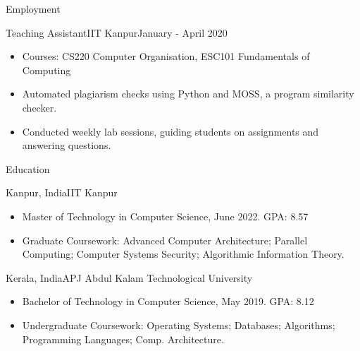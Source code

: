 \documentclass[]{mcdowellcv}
\begin{document}
\begin{cvsection}{Employment}
  		\begin{cvsubsection}{Teaching Assistant}{IIT Kanpur}{January - April 2020}		
			\begin{itemize}
   				\item Courses: CS220 Computer Organisation, ESC101 Fundamentals of Computing
				\item Automated plagiarism checks using Python and MOSS, a program similarity checker.
				\item Conducted weekly lab sessions, guiding students on assignments and answering questions.
			\end{itemize}
		\end{cvsubsection}

	\end{cvsection}
	
	\begin{cvsection}{Education}
		\begin{cvsubsection2}{Kanpur, India}{IIT Kanpur}{}
			\begin{itemize}
				\item Master of Technology in Computer Science, June 2022. GPA: 8.57
				\item Graduate Coursework: Advanced Computer Architecture; Parallel Computing; Computer Systems Security; Algorithmic Information Theory.

			\end{itemize}
		\end{cvsubsection2}

  		\begin{cvsubsection2}{Kerala, India}{APJ Abdul Kalam Technological University}{}
			\begin{itemize}
				\item Bachelor of Technology in Computer Science, May 2019. GPA: 8.12
				\item Undergraduate Coursework: Operating Systems; Databases; Algorithms; Programming Languages; Comp. Architecture.
			\end{itemize}
		\end{cvsubsection2}
	\end{cvsection}
	
\end{document}
